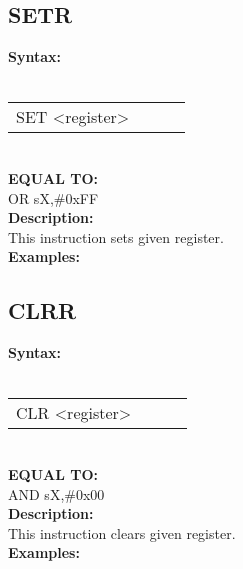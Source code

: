                 \subsection{SETR}
                \textbf{Syntax:}\\
                \\ {
                    \texttt{}
                    \begin{tabular}[h!]{llll}
                            { \color{highlight_instruction} SET    } { \color{highlight_symbol} <register> }
                            { \color{highlight_comment}  }\\
                    \end{tabular}
                    }\\
                    \textbf{EQUAL TO:}\\
                    { \color{highlight_instruction} OR    } { \color{highlight_symbol}      sX,\#0xFF }
                    \\
                \textbf{Description:}\\
                This instruction sets given register.\\
                \textbf{Examples:}\\
                        \begin{code}[h!]
                            symbol}\verb'SET          s0' }\\
                        \end{code}
                \subsection{CLRR}
                \textbf{Syntax:}\\
                \\ {
                    \texttt{}
                    \begin{tabular}[h!]{llll}
                            { \color{highlight_instruction} CLR    } { \color{highlight_symbol} <register> }
                            { \color{highlight_comment}  }\\
                    \end{tabular}
                    }\\
                    \textbf{EQUAL TO:}\\
                    { \color{highlight_instruction} AND    } { \color{highlight_symbol}      sX,\#0x00 }
                    \\
                \textbf{Description:}\\
                This instruction clears given register.\\
                \textbf{Examples:}\\
                        \begin{code}[h!]
                            symbol}\verb'CLR          s0' }\\
                        \end{code}
